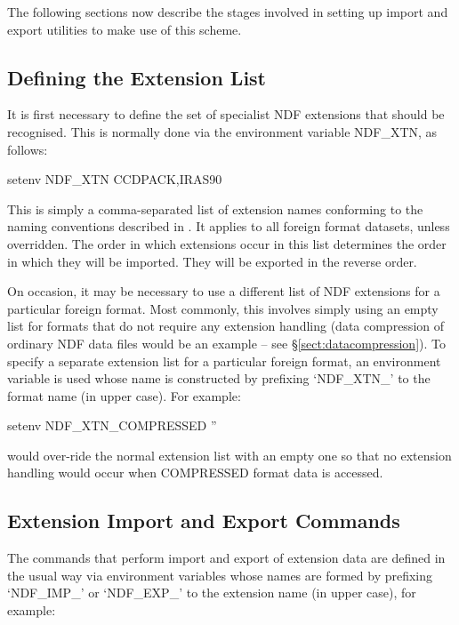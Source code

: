 \documentclass[11pt,twoside,nolof]{starlink}
\begin{document}
The following sections now describe the stages involved in setting up
import and export utilities to make use of this scheme.

\subsection{\label{sect:extensionlist}Defining the Extension List}

It is first necessary to define the set of specialist NDF extensions
that should be recognised. This is normally done via the environment
variable NDF\_XTN, as follows:

\begin{terminalv}
setenv NDF_XTN CCDPACK,IRAS90
\end{terminalv}

This is simply a comma-separated list of extension names conforming to
the naming conventions described in
. It
applies to all foreign format datasets, unless overridden. The order
in which extensions occur in this list determines the order in which
they will be imported. They will be exported in the reverse order.

On occasion, it may be necessary to use a different list of NDF
extensions for a particular foreign format. Most commonly, this
involves simply using an empty list for formats that do not require
any extension handling (data compression of ordinary NDF data files
would be an example -- see \S\ref{sect:datacompression}). To specify a
separate extension list for a particular foreign format, an
environment variable is used whose name is constructed by prefixing
`NDF\_XTN\_' to the format name (in upper case). For example:

\begin{terminalv}
setenv NDF_XTN_COMPRESSED ''
\end{terminalv}

would over-ride the normal extension list with an empty one so that no
extension handling would occur when COMPRESSED format data is
accessed.

\subsection{Extension Import and Export Commands}

The commands that perform import and export of extension data are
defined in the usual way via environment variables whose names are
formed by prefixing `NDF\_IMP\_' or `NDF\_EXP\_' to the extension name
(in upper case), for example:
\end{document}
